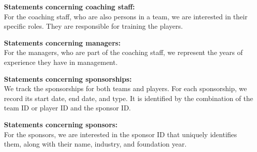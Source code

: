 \vspace{12px}
\textbf{Statements concerning coaching staff:\\}
For the coaching staff, who are also persons in a team, we are interested in their specific roles. They are responsible for training the players.

\vspace{12px}
\textbf{Statements concerning managers:\\}
 For the managers, who are part of the coaching staff, we represent the years of experience they have in management.

\vspace{12px}
\textbf{Statements concerning sponsorships:\\}
We track the sponsorships for both teams and players. For each sponsorship, we record its start date, end date, and type. It is identified by the combination of the team ID or player ID and the sponsor ID.

\vspace{12px}
\textbf{Statements concerning sponsors:\\}
For the sponsors, we are interested in the sponsor ID that uniquely identifies them, along with their name, industry, and foundation year.

\pagebreak


